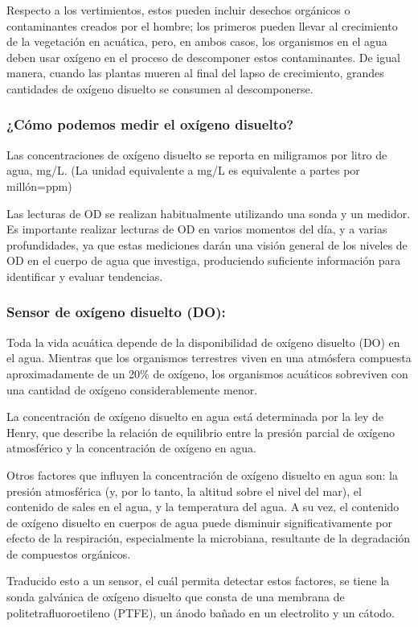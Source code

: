 Respecto a los vertimientos, estos pueden incluir desechos orgánicos o contaminantes creados por el hombre; los primeros pueden llevar al crecimiento de la vegetación en acuática, pero, en ambos casos, los organismos en el agua deben usar oxígeno en el proceso de descomponer estos contaminantes.  De igual manera, cuando las plantas mueren al final del lapso de crecimiento, grandes cantidades de oxígeno disuelto se consumen al descomponerse.

\subsubsection{¿Cómo podemos medir el oxígeno disuelto?}
Las concentraciones de ox\'igeno disuelto se reporta en miligramos  por litro de agua, mg/L. (La unidad equivalente a mg/L es equivalente a partes por millón=ppm)  

Las lecturas de OD se realizan habitualmente utilizando una sonda y un medidor. Es importante realizar lecturas de OD en varios momentos del día, y a varias profundidades, ya que estas mediciones darán una visión general de los niveles de OD en el cuerpo de agua que investiga, produciendo suficiente información para identificar y evaluar tendencias.

\subsubsection{Sensor de ox\'igeno disuelto (DO):}
Toda la vida acuática depende de la disponibilidad de oxígeno disuelto (DO) en el agua. 
Mientras que los organismos terrestres viven en una atmósfera compuesta aproximadamente de un 20\% de ox\'igeno, los organismos acuáticos sobreviven con una cantidad de ox\'igeno considerablemente menor. 

La concentración de oxígeno disuelto en agua está determinada por la ley de Henry, que describe la relación de equilibrio entre la presión parcial de oxígeno atmosférico y la concentración de oxígeno en agua. 

Otros factores que influyen la concentración de oxígeno disuelto en agua son: la presión atmosférica (y, por lo tanto, la altitud sobre el nivel del mar), el contenido de sales en el agua, y la temperatura del agua. A su vez, el contenido de ox\'igeno disuelto en cuerpos de agua puede disminuir significativamente por efecto de la respiración, especialmente la microbiana, resultante de la degradación de compuestos orgánicos. 

Traducido esto a un sensor, el cu\'al permita detectar estos factores, se tiene la sonda galvánica de ox\'igeno disuelto que consta de una membrana de politetrafluoroetileno (PTFE), un ánodo bañado en un electrolito y un cátodo. 

